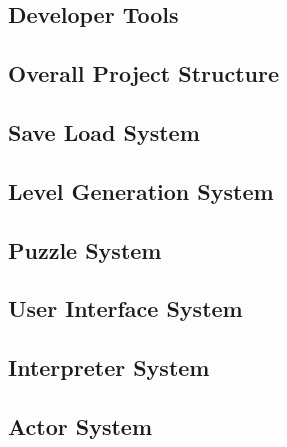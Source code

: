 \subsection{Developer Tools}

\newpage

\subsection{Overall Project Structure}

\newpage

\subsection{Save Load System}

\newpage

\subsection{Level Generation System}

\newpage

\subsection{Puzzle System}

\newpage

\subsection{User Interface System}

\newpage

\subsection{Interpreter System}
\label{section:interpreter}

\newpage

\subsection{Actor System}

\newpage